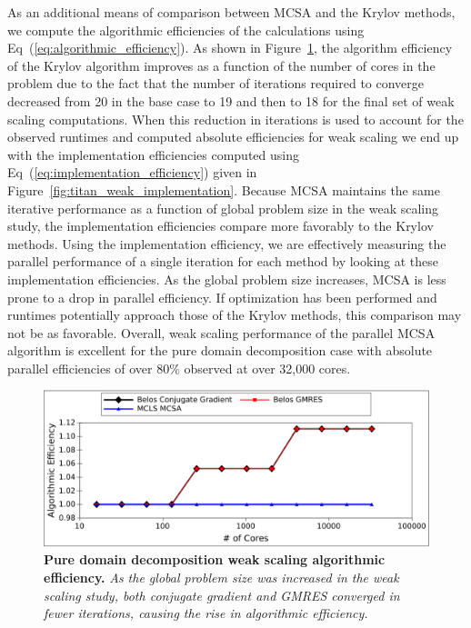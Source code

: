 As an additional means of comparison between MCSA and the Krylov
methods, we compute the algorithmic efficiencies of the calculations
using Eq~(\ref{eq:algorithmic_efficiency}). As shown in
Figure~\ref{fig:titan_weak_algorithmic}, the algorithm efficiency of
the Krylov algorithm improves as a function of the number of cores in
the problem due to the fact that the number of iterations required to
converge decreased from 20 in the base case to 19 and then to 18 for
the final set of weak scaling computations. When this reduction in
iterations is used to account for the observed runtimes and computed
absolute efficiencies for weak scaling we end up with the
implementation efficiencies computed using
Eq~(\ref{eq:implementation_efficiency}) given in
Figure~\ref{fig:titan_weak_implementation}. Because MCSA maintains the
same iterative performance as a function of global problem size in the
weak scaling study, the implementation efficiencies compare more
favorably to the Krylov methods. Using the implementation efficiency,
we are effectively measuring the parallel performance of a single
iteration for each method by looking at these implementation
efficiencies. As the global problem size increases, MCSA is less prone
to a drop in parallel efficiency. If optimization has been performed
and runtimes potentially approach those of the Krylov methods, this
comparison may not be as favorable. Overall, weak scaling performance
of the parallel MCSA algorithm is excellent for the pure domain
decomposition case with absolute parallel efficiencies of over 80\%
observed at over 32,000 cores.

\begin{figure}[t!]
  \begin{center}
    \includegraphics[width=6in]{chapters/parallel_mc/titan_weak_alg_eff.pdf}
  \end{center}
  \caption{\textbf{Pure domain decomposition weak scaling algorithmic
      efficiency.} \textit{As the global problem size was increased in
      the weak scaling study, both conjugate gradient and GMRES
      converged in fewer iterations, causing the rise in algorithmic
      efficiency.}}
  \label{fig:titan_weak_algorithmic}
\end{figure}

